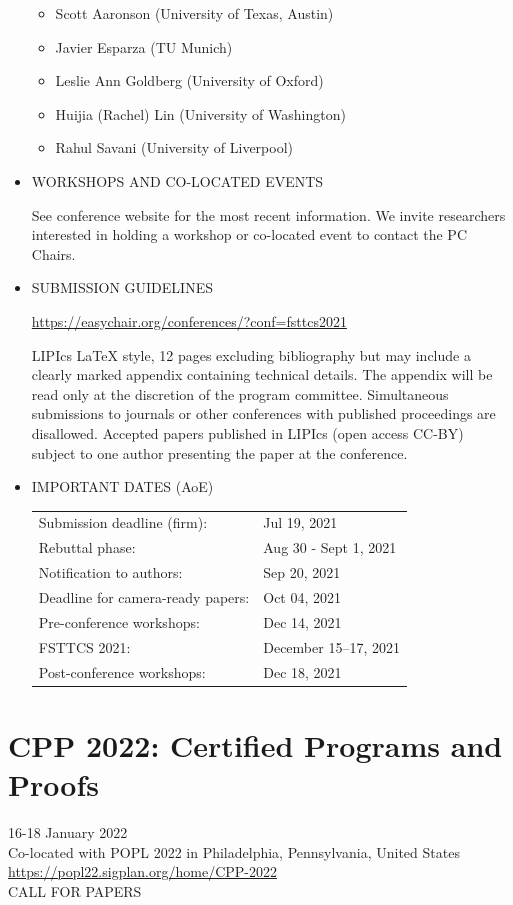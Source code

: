 \documentclass[prodmode,acmtecs]{acmsmall} %
\begin{document}
\begin{itemize}
\begin{itemize}\item  Scott Aaronson (University of Texas, Austin)
\item  Javier Esparza (TU Munich)
\item  Leslie Ann Goldberg (University of Oxford)
\item  Huijia (Rachel) Lin (University of Washington)
\item  Rahul Savani (University of Liverpool)
\end{itemize} 
\item  WORKSHOPS AND CO-LOCATED EVENTS 
 
  See conference website for the most recent information. We invite researchers interested in holding a workshop or co-located event to contact the PC Chairs. 
 
\item  SUBMISSION GUIDELINES 
 
  \href{https://easychair.org/conferences/?conf=fsttcs2021}{https://easychair.org/conferences/?conf=fsttcs2021} 
 
  LIPIcs LaTeX style, 12 pages excluding bibliography but may include a clearly marked appendix containing technical details. The appendix will be read only at the discretion of the program committee. Simultaneous submissions to journals or other conferences with published proceedings are disallowed. Accepted papers published in LIPIcs (open access CC-BY) subject to one author presenting the paper at the conference. 
 
\item  IMPORTANT DATES (AoE) 
 
\begin{tabulary}{\linewidth}{LL}Submission deadline (firm):  & Jul 19, 2021 \\
Rebuttal phase:  & Aug 30 - Sept 1, 2021 \\
Notification to authors:  & Sep 20, 2021 \\
Deadline for camera-ready papers:  & Oct 04, 2021 \\
Pre-conference workshops:  & Dec 14, 2021 \\
FSTTCS 2021:  & December 15–17, 2021 \\
Post-conference workshops:  & Dec 18, 2021 \\
\end{tabulary}
 
\end{itemize}\section{CPP 2022: Certified Programs and Proofs}\label{CPP2022}  16-18 January 2022\\ 
  Co-located with POPL 2022 in Philadelphia, Pennsylvania, United States\\ 
  \href{https://popl22.sigplan.org/home/CPP-2022}{https://popl22.sigplan.org/home/CPP-2022}\\ 
CALL FOR PAPERS 
\end{document}
